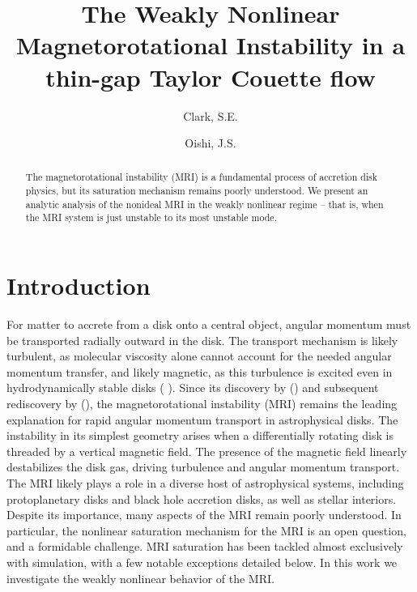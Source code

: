 \documentclass{emulateapj}
\newcommand{\citei}[1]{\citeauthor{#1} \citeyear{#1}}
\begin{document}
\title{The Weakly Nonlinear Magnetorotational Instability in a thin-gap Taylor Couette flow}
\author{Clark, S.E.}
\author{Oishi, J.S. }


\begin{abstract}
The magnetorotational instability (MRI) is a fundamental process of accretion disk physics, but its saturation mechanism remains poorly understood. We present an analytic analysis of the nonideal MRI in the weakly nonlinear regime -- that is, when the MRI system is just unstable to its most unstable mode. 
\end{abstract}

\section{Introduction}

For matter to accrete from a disk onto a central object, angular momentum must be transported radially outward in the disk. The transport mechanism is likely turbulent, as molecular viscosity alone cannot account for the needed angular momentum transfer, and likely magnetic, as this turbulence is excited even in hydrodynamically stable disks (\citei{Shakura:1973wg}). Since its discovery by \citeauthor{Chandrasekhar:1960wh} (\citeyear{Chandrasekhar:1960wh}) and subsequent rediscovery by \citeauthor{Balbus:1991vs} (\citeyear{Balbus:1991vs}), the magnetorotational instability (MRI) remains the leading explanation for rapid angular momentum transport in astrophysical disks. The instability in its simplest geometry arises when a differentially rotating disk is threaded by a vertical magnetic field. The presence of the magnetic field linearly destabilizes the disk gas, driving turbulence and angular momentum transport. The MRI likely plays a role in a diverse host of astrophysical systems, including protoplanetary disks and black hole accretion disks, as well as stellar interiors. Despite its importance, many aspects of the MRI remain poorly understood. In particular, the nonlinear saturation mechanism for the MRI is an open question, and a formidable challenge. MRI saturation has been tackled almost exclusively with simulation, with a few notable exceptions detailed below. In this work we investigate the weakly nonlinear behavior of the MRI.
\end{document}
